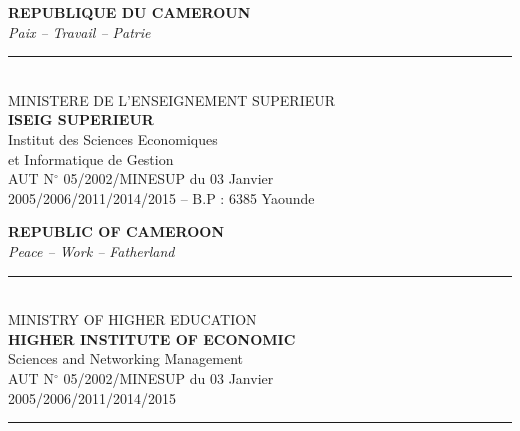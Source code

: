 \documentclass[12pt,a4paper]{report}
\begin{document}

\thispagestyle{empty}
\begin{titlepage}
\begin{center}

\begin{minipage}[t]{0.44\textwidth}
\centering\small
\textbf{REPUBLIQUE DU CAMEROUN}\\
\textit{Paix -- Travail -- Patrie}\\[4pt]
\rule{5cm}{0.5pt}\\[4pt]
MINISTERE DE L'ENSEIGNEMENT SUPERIEUR\\[2pt]
\textbf{ISEIG SUPERIEUR}\\
Institut des Sciences Economiques\\
et Informatique de Gestion\\[2pt]
{\footnotesize AUT N$^\circ$ 05/2002/MINESUP du 03 Janvier\\
2005/2006/2011/2014/2015 -- B.P : 6385 Yaounde}
\end{minipage}
\hfill
\begin{minipage}[t]{0.08\textwidth}
\centering\vspace{-8pt}
\end{minipage}
\hfill
\begin{minipage}[t]{0.42\textwidth}
\centering\small
\textbf{REPUBLIC OF CAMEROON}\\
\textit{Peace -- Work -- Fatherland}\\[4pt]
\rule{5cm}{0.5pt}\\[4pt]
MINISTRY OF HIGHER EDUCATION\\[2pt]
\textbf{HIGHER INSTITUTE OF ECONOMIC}\\
Sciences and Networking Management\\[2pt]
{\footnotesize AUT N$^\circ$ 05/2002/MINESUP du 03 Janvier\\
2005/2006/2011/2014/2015}
\end{minipage}

\vspace{1.3cm}
\rule{\linewidth}{1.5pt}\vspace{0.2cm}


\end{center}
\end{titlepage}
\end{document}
